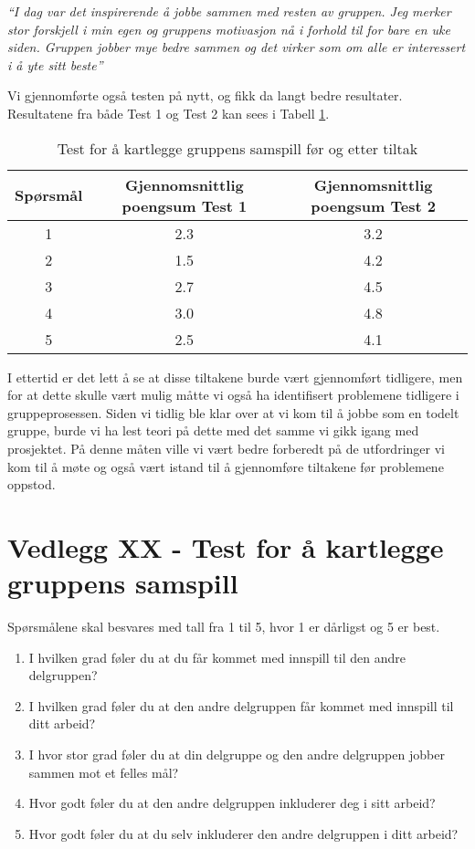 \emph{``I dag var det inspirerende å jobbe sammen med resten av gruppen. Jeg merker stor forskjell i min egen og gruppens motivasjon nå i forhold til for bare en uke siden. Gruppen jobber mye bedre sammen og det virker som om alle er interessert i å yte sitt beste''}\newline

Vi gjennomførte også testen på nytt, og fikk da langt bedre resultater. Resultatene fra både Test 1 og Test 2 kan sees i Tabell \ref{Test}. \newline

\begin{table}[h]
\begin{center}
\begin{tabular}{| c | c | c | }
\hline
Spørsmål & Gjennomsnittlig poengsum Test 1 & Gjennomsnittlig poengsum Test 2 \\ \hline
1 & 2.3 & 3.2 \\ \hline
2 & 1.5 & 4.2 \\ \hline
3 & 2.7 & 4.5 \\ \hline
4 & 3.0 & 4.8 \\ \hline
5 & 2.5 & 4.1 \\ \hline
\end{tabular}
\caption{Test for å kartlegge gruppens samspill før og etter tiltak}
\label{Test}
\end{center}
\end{table}

I ettertid er det lett å se at disse tiltakene burde vært gjennomført tidligere, men for at dette skulle vært mulig måtte vi også ha identifisert problemene tidligere i gruppeprosessen. Siden vi tidlig ble klar over at vi kom til å jobbe som en todelt gruppe, burde vi ha lest teori på dette med det samme vi gikk igang med prosjektet. På denne måten ville vi vært bedre forberedt på de utfordringer vi kom til å møte og også vært istand til å gjennomføre tiltakene før problemene oppstod.

\section{Vedlegg XX - Test for å kartlegge gruppens samspill}
Spørsmålene skal besvares med tall fra 1 til 5, hvor 1 er dårligst og 5 er best.\newline
\begin{enumerate}
\item I hvilken grad  føler du at du får kommet med innspill til den andre delgruppen?
\item I hvilken grad føler du at den andre delgruppen får kommet med innspill til ditt arbeid?
\item I hvor stor grad føler du at din delgruppe og den andre delgruppen jobber sammen mot et felles mål?
\item Hvor godt føler du at den andre delgruppen inkluderer deg i sitt arbeid?
\item Hvor godt føler du at du selv inkluderer den andre delgruppen i ditt arbeid?
\end{enumerate}



